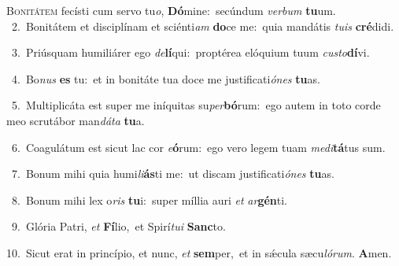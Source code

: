 \lettrine{\initial\textcolor{\initialcolor}{B}}{onitátem} fecísti cum servo tu\-\textit{o}\-, \textbf{Dó}\-mine:~\star secúndum \textit{ver}\-\textit{bum} \textbf{tu}\-um.\\
{\numbfont\textcolor{\numbcolor}{~2.}}~Bonitátem et disciplínam et sciénti\textit{am} \textbf{do}\-ce me:~\star quia mandátis \textit{tu}\-\textit{is} \textbf{cré}\-didi.\par
{\numbfont\textcolor{\numbcolor}{~3.}}~Priúsquam humiliárer ego \textit{de}\-\textbf{lí}qui:~\star proptérea elóquium tuum \textit{cus}\-\textit{to}\textbf{dí}vi.\par
{\numbfont\textcolor{\numbcolor}{~4.}}~Bo\textit{nus} \textbf{es} tu:~\star et in bonitáte tua doce me justificati\-\textit{ó}\-\textit{nes} \textbf{tu}\-as.\par
{\numbfont\textcolor{\numbcolor}{~5.}}~Multiplicáta est super me iníquitas su\-\textit{per}\-\textbf{bó}rum:~\star ego autem in toto corde meo scrutábor man\-\textit{dá}\-\textit{ta} \textbf{tu}\-a.\par
{\numbfont\textcolor{\numbcolor}{~6.}}~Coagulátum est sicut lac cor \textit{e}\-\textbf{ó}rum:~\star ego vero legem tuam \textit{me}\-\textit{di}\textbf{tá}tus sum.\par
{\numbfont\textcolor{\numbcolor}{~7.}}~Bonum mihi quia humi\-\textit{li}\-\textbf{ás}ti me:~\star ut discam justificati\-\textit{ó}\-\textit{nes} \textbf{tu}\-as.\par
{\numbfont\textcolor{\numbcolor}{~8.}}~Bonum mihi lex o\textit{ris} \textbf{tu}\-i:~\star super míllia auri \textit{et} \textit{ar}\-\textbf{gén}ti.\par
{\numbfont\textcolor{\numbcolor}{~9.}}~Glória Patri, \textit{et} \textbf{Fí}\-lio,~\star et Spirí\-\textit{tu}\-\textit{i} \textbf{Sanc}\-to.\par
{\numbfont\textcolor{\numbcolor}{10.}}~Sicut erat in princípio, et nunc, \textit{et} \textbf{sem}\-per,~\star et in sǽcula sæcu\-\textit{ló}\-\textit{rum}. \textbf{A}\-men.\par
